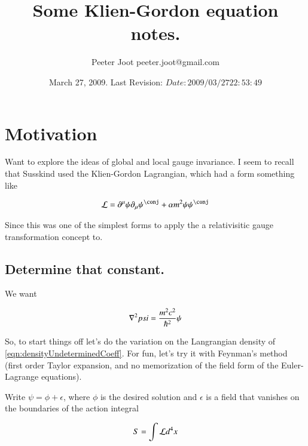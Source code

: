 \documentclass{article}
\title{ Some Klien-Gordon equation notes. }
\author{Peeter Joot \quad peeter.joot@gmail.com }
\date{ March 27, 2009.  Last Revision: $Date: 2009/03/27 22:53:49 $ }
\begin{document}
\maketitle{}
\tableofcontents
\section{ Motivation }

Want to explore the ideas of global and local gauge invariance.  I seem to recall that Susskind
used the Klien-Gordon Lagrangian, which had a form something like

\begin{align}\label{eqn:densityUndeterminedCoeff}
\LL = \partial^\mu \psi \partial_\mu \psi^\conj + \alpha m^2 \psi \psi^\conj
\end{align}

Since this was one of the simplest forms to apply the 
a relativisitic gauge transformation concept to.

\subsection{ Determine that constant. }

We want

\begin{align*}
\nabla^2 psi = \frac{m^2 c^2}{\hbar^2} \psi
\end{align*}

So, to start things off let's do the variation on the Langrangian density of \ref{eqn:densityUndeterminedCoeff}.  For fun, let's try it with Feynman's method (first order Taylor expansion, and no memorization
of the field form of the Euler-Lagrange equations).

Write $\psi = \phi + \epsilon$, where $\phi$ is the desired solution and $\epsilon$ is a field that
vanishes on the boundaries of the action integral

\begin{align*}
S 
&= \int \mathcal{L} d^4 x \\
\end{align*}



\end{document}
